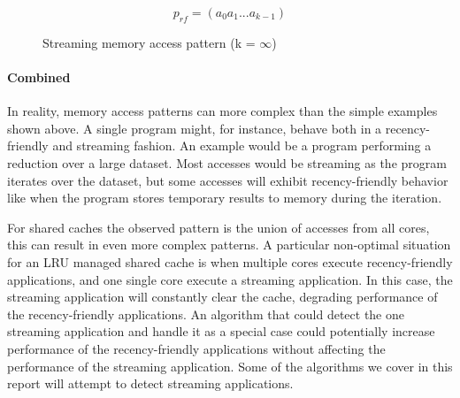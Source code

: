 \begin{figure}[ht]
\centering
\begin{equation}
p_{rf} = (a_0 a_1 ... a_{k-1})
\end{equation}
\caption{Streaming memory access  pattern (k = $\infty$) }
\label{fig:background:algorithms:st_pattern}
\end{figure}

\paragraph{Combined}
In reality, memory access patterns can more complex than the simple examples shown above.
A single program might, for instance, behave both in a recency-friendly and streaming fashion. 
An example would be a program performing a reduction over a large dataset.
Most accesses would be streaming as the program iterates over the dataset, but some accesses will exhibit recency-friendly behavior like when the program stores temporary results to memory during the iteration.

For shared caches the observed pattern is the union of accesses from all cores, this can result in even more complex patterns.
A particular non-optimal situation for an LRU managed shared cache is when multiple cores execute recency-friendly applications, and one single core execute a streaming application.
In this case, the streaming application will constantly clear the cache, degrading performance of the recency-friendly applications.
An algorithm that could detect the one streaming application and handle it as a special case could potentially increase performance of the recency-friendly applications without affecting the performance of the streaming application.
Some of the algorithms we cover in this report will attempt to detect streaming applications.